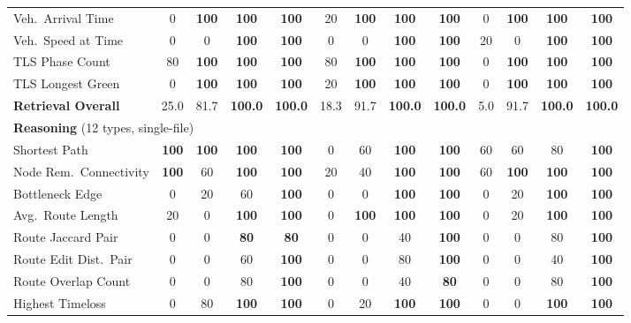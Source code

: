 \begin{table}[t]
{\begin{tabular}{l|cccc|cccc|cccc}
Veh.\ Arrival Time          & 0 & \textbf{100} & \textbf{100} & \textbf{100} & 20 & \textbf{100} & \textbf{100} & \textbf{100} & 0 & \textbf{100} & \textbf{100} & \textbf{100} \\
Veh.\ Speed at Time         & 0 & 0 & \textbf{100} & \textbf{100} & 0 & 0 & \textbf{100} & \textbf{100} & 20 & 0 & \textbf{100} & \textbf{100} \\
TLS Phase Count             & 80 & \textbf{100} & \textbf{100} & \textbf{100} & 80 & \textbf{100} & \textbf{100} & \textbf{100} & 0 & \textbf{100} & \textbf{100} & \textbf{100} \\
TLS Longest Green           & 0 & \textbf{100} & \textbf{100} & \textbf{100} & 20 & \textbf{100} & \textbf{100} & \textbf{100} & 0 & \textbf{100} & \textbf{100} & \textbf{100} \\
\cmidrule(lr){1-13}
\textbf{Retrieval Overall}  & 25.0 & 81.7 & \textbf{100.0} & \textbf{100.0} & 18.3 & 91.7 & \textbf{100.0} & \textbf{100.0} & 5.0 & 91.7 & \textbf{100.0} & \textbf{100.0} \\
\midrule
\multicolumn{13}{l}{\textbf{Reasoning} (12 types, single-file)}\\
Shortest Path               & \textbf{100} & \textbf{100} & \textbf{100} & \textbf{100} & 0 & 60 & \textbf{100} & \textbf{100} & 60 & 60 & 80 & \textbf{100} \\
Node Rem.\ Connectivity     & \textbf{100} & 60 & \textbf{100} & \textbf{100} & 20 & 40 & \textbf{100} & \textbf{100} & 60 & \textbf{100} & \textbf{100} & \textbf{100} \\
Bottleneck Edge             & 0 & 20 & 60 & \textbf{100} & 0 & 0 & \textbf{100} & \textbf{100} & 0 & 20 & \textbf{100} & \textbf{100} \\
Avg.\ Route Length          & 20 & 0 & \textbf{100} & \textbf{100} & 0 & \textbf{100} & \textbf{100} & \textbf{100} & 0 & 20 & \textbf{100} & \textbf{100} \\
Route Jaccard Pair          & 0 & 0 & \textbf{80} & \textbf{80} & 0 & 0 & 40 & \textbf{100} & 0 & 0 & 80 & \textbf{100} \\
Route Edit Dist.\ Pair      & 0 & 0 & 60 & \textbf{100} & 0 & 0 & 80 & \textbf{100} & 0 & 0 & 40 & \textbf{100} \\
Route Overlap Count         & 0 & 0 & 80 & \textbf{100} & 0 & 0 & 40 & \textbf{80} & 0 & 0 & 80 & \textbf{100} \\
Highest Timeloss            & 0 & 80 & \textbf{100} & \textbf{100} & 0 & 20 & \textbf{100} & \textbf{100} & 0 & 0 & \textbf{100} & \textbf{100} \\

\end{tabular}}
\end{table}
